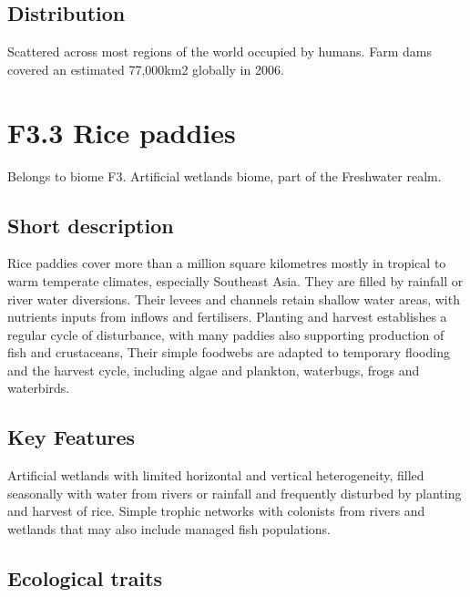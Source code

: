 \documentclass[
  letterpaper,
  DIV=11,
  numbers=noendperiod]{scrartcl}
\begin{document}
\subsection{Distribution}\label{distribution-127}

Scattered across most regions of the world occupied by humans. Farm dams
covered an estimated 77,000km2 globally in 2006.

\section{F3.3 Rice paddies}\label{f3.3-rice-paddies-1}

Belongs to biome F3. Artificial wetlands biome, part of the Freshwater
realm.

\subsection{Short description}\label{short-description-128}

Rice paddies cover more than a million square kilometres mostly in
tropical to warm temperate climates, especially Southeast Asia. They are
filled by rainfall or river water diversions. Their levees and channels
retain shallow water areas, with nutrients inputs from inflows and
fertilisers. Planting and harvest establishes a regular cycle of
disturbance, with many paddies also supporting production of fish and
crustaceans, Their simple foodwebs are adapted to temporary flooding and
the harvest cycle, including algae and plankton, waterbugs, frogs and
waterbirds.

\subsection{Key Features}\label{key-features-128}

Artificial wetlands with limited horizontal and vertical heterogeneity,
filled seasonally with water from rivers or rainfall and frequently
disturbed by planting and harvest of rice. Simple trophic networks with
colonists from rivers and wetlands that may also include managed fish
populations.

\subsection{Ecological traits}\label{ecological-traits-128}
\end{document}

